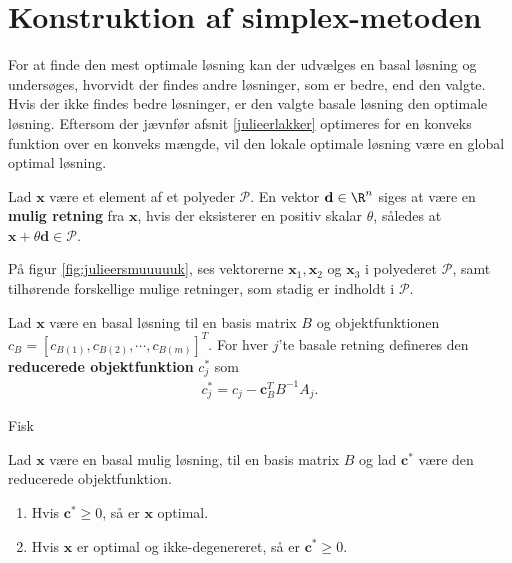 %
\section{Konstruktion af simplex-metoden}
%
For at finde den mest optimale løsning kan der udvælges en basal løsning og undersøges, hvorvidt der findes andre løsninger, som er bedre, end den valgte. 
Hvis der ikke findes bedre løsninger, er den valgte basale løsning den optimale løsning. 
Eftersom der jævnfør afsnit \ref{julieerlakker} optimeres for en konveks funktion over en konveks mængde, %
vil den lokale optimale løsning være en global optimal løsning. 
%
%
\begin{defn}{}{}
Lad $\textbf{x}$ være et element af et polyeder $\mathcal{P}$.
En vektor $\textbf{d}\in \R^n$ siges at være en  \textbf{mulig retning} fra $\textbf{x}$, hvis der eksisterer en positiv skalar $\theta$, således at $\textbf{x}+\theta \textbf{d}\in \mathcal{P}$.
\end{defn}
\noindent
%
På figur \ref{fig:julieersmuuuuuk}, ses vektorerne $\mathbf{x}_1, \mathbf{x}_2$ og $\mathbf{x}_3$ i polyederet $\mathcal{P}$, samt tilhørende forskellige mulige retninger, som stadig er indholdt i $\mathcal{P}$.
%

%
%
%
\begin{defn}{}{}
Lad $\mathbf{x}$ være en basal løsning til en basis matrix $B$ og objektfunktionen $c_B=[ c_{B(1)},c_{B(2)}, \cdots , c_{B(m)} ]^T.$
For hver $j$'te basale retning defineres den \textbf{reducerede objektfunktion} $c_j^*$ som
\begin{align*}
c_j^* = c_j - \mathbf{c}_B^T B^{-1}A_j.
\end{align*} 
%
\end{defn}
\noindent
%
Fisk
%
\begin{thm}{}{}
Lad $\mathbf{x}$ være en basal mulig løsning, til en basis matrix $B$ og lad $\mathbf{c}^*$ være den reducerede objektfunktion. 
\begin{enumerate}[label = (\alph*)]
\item Hvis $\mathbf{c}^* \geq 0$, så er $\mathbf{x}$ optimal.
\item Hvis $\mathbf{x}$ er optimal og ikke-degenereret, så er $\mathbf{c}^* \geq 0$.
\end{enumerate}
\end{thm}
